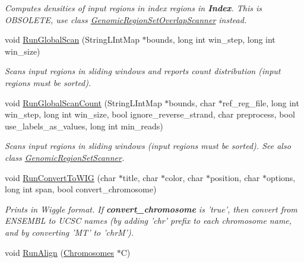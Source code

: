 \begin{CompactItemize}
\begin{CompactList}\small\item\em Computes densities of input regions in index regions in {\bf Index}. This is OBSOLETE, use class \hyperlink{classGenomicRegionSetOverlapScanner}{GenomicRegionSetOverlapScanner} instead. \item\end{CompactList}\item 
\hypertarget{classGenomicRegionSet_14610521cc47631b1459c2e3488b0eec}{
void \hyperlink{classGenomicRegionSet_14610521cc47631b1459c2e3488b0eec}{RunGlobalScan} (StringLIntMap $\ast$bounds, long int win\_\-step, long int win\_\-size)}
\label{classGenomicRegionSet_14610521cc47631b1459c2e3488b0eec}

\begin{CompactList}\small\item\em Scans input regions in sliding windows and reports count distribution (input regions must be sorted). \item\end{CompactList}\item 
void \hyperlink{classGenomicRegionSet_45cac26bedec4d983127b93d2096f735}{RunGlobalScanCount} (StringLIntMap $\ast$bounds, char $\ast$ref\_\-reg\_\-file, long int win\_\-step, long int win\_\-size, bool ignore\_\-reverse\_\-strand, char preprocess, bool use\_\-labels\_\-as\_\-values, long int min\_\-reads)
\begin{CompactList}\small\item\em Scans input regions in sliding windows (input regions must be sorted). See also class \hyperlink{classGenomicRegionSetScanner}{GenomicRegionSetScanner}. \item\end{CompactList}\item 
\hypertarget{classGenomicRegionSet_6377c10b1e9903ff5ae3b0ff9fe20e4d}{
void \hyperlink{classGenomicRegionSet_6377c10b1e9903ff5ae3b0ff9fe20e4d}{RunConvertToWIG} (char $\ast$title, char $\ast$color, char $\ast$position, char $\ast$options, long int span, bool convert\_\-chromosome)}
\label{classGenomicRegionSet_6377c10b1e9903ff5ae3b0ff9fe20e4d}

\begin{CompactList}\small\item\em Prints in Wiggle format. If {\bf convert\_\-chromosome} is 'true', then convert from ENSEMBL to UCSC names (by adding 'chr' prefix to each chromosome name, and by converting 'MT' to 'chrM'). \item\end{CompactList}\item 
\hypertarget{classGenomicRegionSet_da3da7ef918c09867341cda32881d63e}{
void \hyperlink{classGenomicRegionSet_da3da7ef918c09867341cda32881d63e}{RunAlign} (\hyperlink{classChromosomes}{Chromosomes} $\ast$C)}
\label{classGenomicRegionSet_da3da7ef918c09867341cda32881d63e}


\end{CompactItemize}
